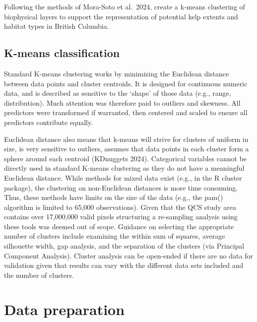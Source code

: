 \documentclass[
  11pt,
]{article}
\begin{document}
Following the methods of Mora-Soto et al.~2024, create a k-means
clustering of biophysical layers to support the representation of
potential kelp extents and habitat types in British Columbia.

\hypertarget{k-means-classification}{%
\subsection{K-means classification}\label{k-means-classification}}

Standard K-means clustering works by minimizing the Euclidean distance
between data points and cluster centroids. It is designed for continuous
numeric data, and is described as sensitive to the `shape' of those data
(e.g., range, distribution). Much attention was therefore paid to
outliers and skewness. All predictors were transformed if warranted,
then centered and scaled to ensure all predictors contribute equally.

Euclidean distance also means that k-means will strive for clusters of
uniform in size, is very sensitive to outliers, assumes that data points
in each cluster form a sphere around each centroid (KDnuggets 2024).
Categorical variables cannot be directly used in standard K-means
clustering as they do not have a meaningful Euclidean distance. While
methods for mixed data exist (e.g., in the R cluster package), the
clustering on non-Euclidean distances is more time consuming. Thus,
these methods have limits on the size of the data (e.g., the pam()
algorithm is limited to 65,000 observations). Given that the QCS study
area contains over 17,000,000 valid pixels structuring a re-sampling
analysis using these tools was deemed out of scope. Guidance on
selecting the appropriate number of clusters include examining the
within sum of squares, average silhouette width, gap analysis, and the
separation of the clusters (via Principal Component Analysis). Cluster
analysis can be open-ended if there are no data for validation given
that results can vary with the different data sets included and the
number of clusters.

\hypertarget{data-preparation}{%
\section{Data preparation}\label{data-preparation}}
\end{document}
